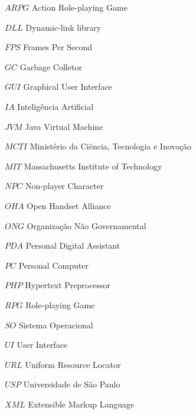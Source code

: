 
\begin{simbolos} \itemsep -1pt
\item[$ ARPG $] Action Role-playing Game
\item [$ DLL $] Dynamic-link library
\item[$ FPS $] Frames Per Second
\item [$ GC $] Garbage Colletor
\item[$ GUI $] Graphical User Interface

\item[$ IA $] Inteligência Artificial
\item [$ JVM $] Java Virtual Machine
\item [$ MCTI $] Ministério da Ciência, Tecnologia e Inovação
\item [$ MIT $] Massachusetts Institute of Technology
\item[$ NPC $] Non-player Character
\item [$ OHA $] Open Handset Alliance
\item [$ ONG $] Organização Não Governamental
\item [$ PDA $] Personal Digital Assistant
\item [$ PC $] Personal Computer
\item[$ PHP $] Hypertext Preprocessor
\item[$ RPG $] Role-playing Game
\item [$ SO $] Sistema Operacional
\item[$ UI $] User Interface
\item [$ URL $] Uniform Resource Locator
\item [$ USP $] Universidade de São Paulo 
\item [$ XML $] Extensible Markup Language

\end{simbolos}